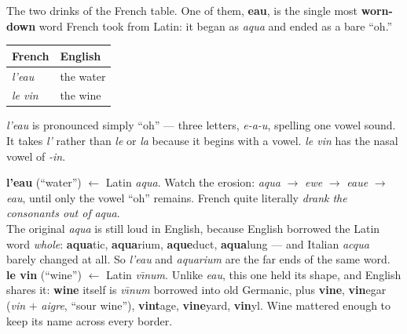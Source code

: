 The two drinks of the French table. One of them, \textbf{eau}, is the single
most \textbf{worn-down} word French took from Latin: it began as \emph{aqua}
and ended as a bare ``oh.''

\begin{center}
\begin{tabular}{@{}ll@{}}
\toprule
French & English \\
\midrule
\emph{l'eau} & the water \\
\emph{le vin} & the wine \\
\bottomrule
\end{tabular}
\end{center}

\begin{sounds}
\emph{l'eau} is pronounced simply ``oh'' --- three letters, \emph{e-a-u},
spelling one vowel sound. It takes \emph{l'} rather than \emph{le} or \emph{la}
because it begins with a vowel. \emph{le vin} has the nasal vowel of
\emph{-in}.
\end{sounds}

\begin{cousinweb}
\textbf{l'eau} (``water'') $\leftarrow$ Latin \emph{aqua}. Watch the erosion:
\emph{aqua} $\to$ \emph{ewe} $\to$ \emph{eaue} $\to$ \emph{eau}, until only the
vowel ``oh'' remains. French quite literally \emph{drank the consonants out of}
\emph{aqua}.\\[3pt]
The original \emph{aqua} is still loud in English, because English borrowed the
Latin word \emph{whole}: \textbf{aqua}tic, \textbf{aqua}rium,
\textbf{aque}duct, \textbf{aqua}lung --- and Italian \emph{acqua} barely
changed at all. So \emph{l'eau} and \emph{aquarium} are the far ends of the
same word.\\[3pt]
\textbf{le vin} (``wine'') $\leftarrow$ Latin \emph{v\={\i}num}. Unlike
\emph{eau}, this one held its shape, and English shares it: \textbf{wine}
itself is \emph{v\={\i}num} borrowed into old Germanic, plus \textbf{vine},
\textbf{vin}egar (\emph{vin} $+$ \emph{aigre}, ``sour wine''),
\textbf{vint}age, \textbf{vine}yard, \textbf{vin}yl. Wine mattered enough to
keep its name across every border.
\end{cousinweb}
